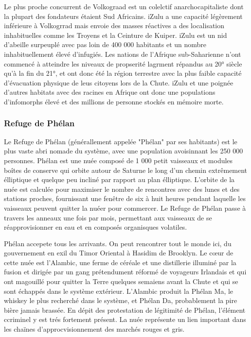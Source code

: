 Le plus proche concurrent de Volkograad est un colelctif anarchocapitaliste dont la plupart des fondateurs étaient Sud Africains. iZulu a une capacité légèrement inférieure à Volkogrrad mais envoie des masses réactives a des localisation inhabituelles comme les Troyens et la Ceinture de Kuiper. iZulu est un nid d'abeille surpeuplé avec pas loin de 400 000 habitants et un nombre inhabituellement élevé d'infugiés. Les nations de l'Afrique sub-Saharienne n'ont commencé à atteindre les niveaux de propserité lagrment répandus au 20° siècle qu'à la fin du 21°, et ont donc été la région terrestre avec la plus faible capacité d'évacuation physique de leus citoyens lors de la Chute. iZulu et une poignée d'autres habitats avec des racines en Afrique ont donc une populations d'infomorphs élevé et des millions de personne stockés en mémoire morte. 

\subsubsection{Refuge de Phélan} \label{sec:phelans-recourse} 

Le Refuge de Phélan (générallement appelée "Phélan" par ses habitants) est le plus vaste abri nomade du système, avec une population avoisinnant les 250 000 personnes. Phélan est une nuée composé de 1 000 petit vaisseaux et modules boîtes de conserve qui orbite autour de Saturne le long d'un chemin extrêmement élliptique et quelque peu incliné par rapport au plan élliptique. L'orbite de la nuée est calculée pour maximiser le nombre de rencontres avec des lunes et des stations proches, fournissant une fenêtre de six à huit heures pendant laquelle les vaisseaux peuvent quitter la nuéer pour commercer. Le Refuge de Phélan passe à travers les anneaux une fois par mois, permettant aux vaisseaux de se réapprovisionner en eau et en composés organisques volatiles. 

Phélan accepete tous les arrivants. On peut rencontrer tout le monde ici, du gouvernement en exil du Timor Oriental à Hasidim de Brooklyn. Le cœur de cette nuée est l'Alambic, une ferme de céréale et une distillerie illuminé par la fusion et dirigée par un gang prétendument réformé de voyageurs Irlandais et qui ont magouillé pour quitter la Terre quelques semaiens avant la Chute et qui se sont échappés dans le système extérieur. L'Alambic produit la Phélan Ma, le whiskey le plus recherché dans le système, et Phélan Da, probablement la pire bière jamais brassée. En dépit des protestation de légitimité de Phélan, l'élément ccriminel y est trés fortement présent. La nuée représente un lien important dans les chaïnes d'approcvisionnement des marchés rouges et gris. 


